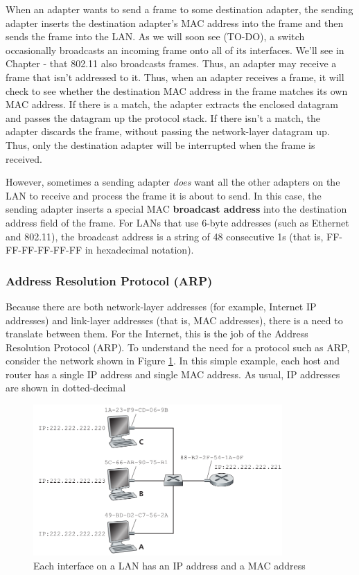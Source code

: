 \documentclass[a4paper,12pt]{book}
\begin{document}
When an adapter wants to send a frame to some destination adapter, the sending adapter inserts the destination adapter’s MAC address into the frame and then sends the frame into the LAN. As we will soon see (TO-DO), a switch occasionally broadcasts an incoming frame onto all of its interfaces. We’ll see in Chapter - that 802.11 also broadcasts frames. Thus, an adapter may receive a frame that isn’t addressed to it. Thus, when
an adapter receives a frame, it will check to see whether the destination MAC address in the frame matches its own MAC address. If there is a match, the adapter extracts the enclosed datagram and passes the datagram up the protocol stack. If there isn’t a match, the adapter discards the frame, without passing the network-layer datagram up. Thus, only the destination adapter will be interrupted when the frame is received.

However, sometimes a sending adapter \emph{does} want all the other adapters on the LAN to receive and process the frame it is about to send. In this case, the sending adapter inserts a special MAC \textbf{broadcast address} into the destination address field of the frame. For LANs that use 6-byte addresses (such as Ethernet and 802.11), the broadcast address is a string of 48 consecutive 1s (that is, FF-FF-FF-FF-FF-FF in hexadecimal notation).


\subsubsection{Address Resolution Protocol (ARP)}

Because there are both network-layer addresses (for example, Internet IP addresses) and link-layer addresses (that is, MAC addresses), there is a need to translate between them. For the Internet, this is the job of the Address Resolution Protocol (ARP). To understand the need for a protocol such as ARP, consider the network shown in Figure \ref{fig:ARP}. In this simple example, each host and router has a single IP address and single MAC address. As usual, IP addresses are shown in dotted-decimal

\begin{figure}
\centering
\includegraphics[width=9.5cm]{./ARP.PNG}
\caption{Each interface on a LAN has an IP address and a MAC address}\label{fig:ARP}
\end{figure}
\end{document}
